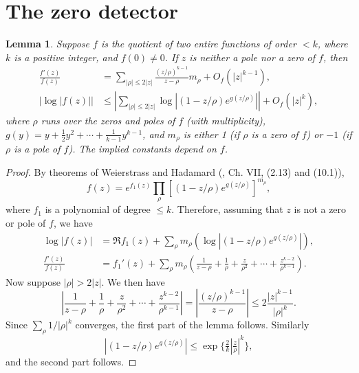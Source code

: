 \documentclass[10pt]{amsart}
\theoremstyle{remark}
\theoremstyle{plain}
\newtheorem{lemma}{Lemma}[section]
\numberwithin{equation}{section}
\theoremstyle{definition}
\def\({\left(}
\def\){\right)}
\begin{document}
\section{The zero detector} \label{sec:zero detect}   %


\begin{lemma}\label{lem:entire}
Suppose $f$ is the quotient of two entire 
functions of order $<k$, where $k$ is a positive integer, and $f(0)\ne 0$.
 If $z$ is neither a pole nor a zero of $f$, then
\begin{align*}
\frac{f'(z)}{f(z)} &= \sum_{|\rho| \le 2|z|}  \frac{(z/\rho)^{k-1}}{z-\rho}
 m_\rho + O_f \(|z|^{k-1} \), \\
\bigl|\log |f(z)| \bigr| &\le \left| \sum_{|\rho| \le 2|z|} 
\log\left| (1-z/\rho)e^{g(z/\rho)} \right|  \right| + O_f \( |z|^k \),
\end{align*}
where $\rho$ runs over the zeros and poles of $f$ (with multiplicity),
$g(y) = y + \frac12 y^2 + \cdots + \frac{1}{k-1} y^{k-1}$,
 and $m_\rho$ is either 1 (if $\rho$ is a zero of $f$)
or $-1$ (if $\rho$ is a pole of $f$).  The implied constants depend on $f$.
\end{lemma}

\begin{proof}  By theorems of Weierstrass and Hadamard (\cite{SZ}, 
Ch. VII, (2.13) and (10.1)),
$$
f(z) = e^{f_1(z)} \prod_\rho \left[ (1-z/\rho) e^{g(z/\rho)} \right]^{m_\rho},
$$
where $f_1$ is a polynomial of degree $\le k$.  Therefore, assuming that $z$
is not a zero or pole of $f$, we have
\begin{align*}
\log |f(z)| &= \Re f_1(z) + \sum_\rho m_\rho 
\( \log |(1-z/\rho) e^{g(z/\rho)}|\), \\
\frac{f'(z)}{f(z)} &= f_1'(z) + \sum_\rho m_\rho \( \frac{1}{z-\rho} +
 \frac{1}{\rho} +\frac{z}{\rho^2} + \cdots + \frac{z^{k-2}}{\rho^{k-1}} \).
\end{align*}
Now suppose $|\rho| > 2|z|$.  We then have 
$$
\left|  \frac{1}{z-\rho} +
 \frac{1}{\rho} +\frac{z}{\rho^2} + \cdots + \frac{z^{k-2}}{\rho^{k-1}} \right|
= \left| \frac{(z/\rho)^{k-1}}{z-\rho} \right| \le 2\frac{|z|^{k-1}}{|\rho|^k}.
$$
Since $\sum_\rho 1/|\rho|^k$ converges, the first part of the lemma follows.
Similarly
$$
\left| (1-z/\rho) e^{g(z/\rho)} \right| \le \exp \{ \tfrac{2}{k} | \tfrac{z}
{\rho} |^k \},
$$
and the second part follows.
\end{proof}
\end{document}
